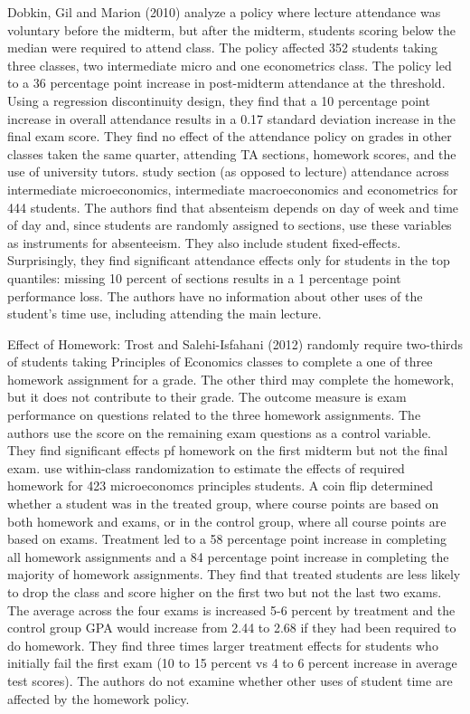 \documentclass[12pt]{article}
\begin{document}
Dobkin, Gil and Marion (2010) analyze a policy where lecture attendance was voluntary before the midterm, but after the midterm, students scoring below the median were required to attend class. The policy affected 352 students taking three classes, two intermediate micro and one econometrics class. The policy led to a 36 percentage point increase in post-midterm attendance at the threshold. Using a regression discontinuity design, they find that a 10 percentage point increase in overall attendance results in a 0.17 standard deviation increase in the final exam score. They find no effect of the attendance policy on grades in other classes taken the same quarter, attending TA sections, homework scores, and the use of university tutors.
\textcite{ans2012} study section (as opposed to lecture) attendance across intermediate microeconomics, intermediate macroeconomics and econometrics for 444 students. The authors find that absenteism depends on day of week and time of day and, since students are randomly assigned to sections, use these variables as instruments for absenteeism. They also include student fixed-effects. Surprisingly, they find significant attendance effects only for students in the top quantiles: missing 10 percent of sections results in a 1 percentage point performance loss. The authors have no information about other uses of the student's time use, including attending the main lecture.

Effect of Homework: Trost and Salehi-Isfahani (2012) randomly require two-thirds of students taking Principles of Economics classes to complete a one of three homework assignment for a grade. The other third may complete the homework, but it does not contribute to their grade. The outcome measure is exam performance on questions related to the three homework assignments. The authors use the score on the remaining exam questions as a control variable. They find significant effects pf homework on the first midterm but not the final exam. \textcite{gr2013} use within-class randomization to estimate the effects of required homework for 423 microeconomcs principles students. A coin flip determined whether a student was in the treated group, where course points are based on both homework and exams, or in the control group, where all course points are based on exams. Treatment led to a 58 percentage point increase in completing all homework assignments and a 84 percentage point increase in completing the majority of homework assignments. They find that treated students are less likely to drop the class and score higher on the first two but not the last two exams. The average across the four exams is increased 5-6 percent by treatment and the control group GPA would increase from 2.44 to 2.68 if they had been required to do homework. They find three times larger treatment effects for students who initially fail the first exam (10 to 15 percent vs 4 to 6 percent increase in average test scores). The authors do not examine whether other uses of student time are affected by the homework policy.
\end{document}
